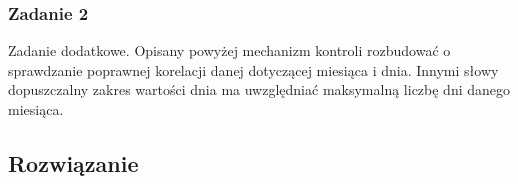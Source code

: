 \documentclass[a4paper,12pt]{extarticle}  %
\begin{document}
\subsubsection{Zadanie 2}
Zadanie dodatkowe. Opisany powyżej mechanizm kontroli rozbudować o sprawdzanie poprawnej korelacji
danej dotyczącej miesiąca i dnia. Innymi słowy dopuszczalny zakres wartości dnia ma uwzględniać maksymalną
liczbę dni danego miesiąca.
\subsection{Rozwiązanie}


% 
\end{document}
